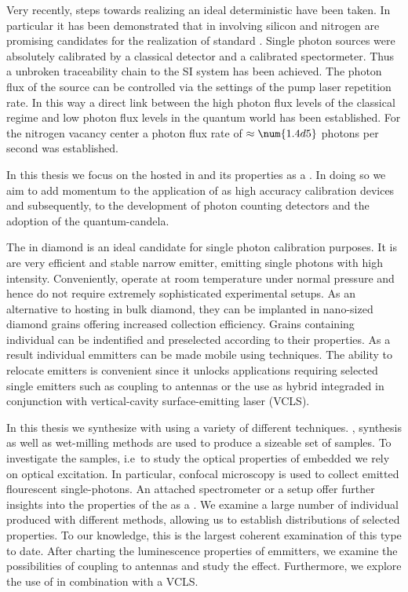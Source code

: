 	Very recently, steps towards realizing an ideal deterministic \sps have been taken. In particular it has been demonstrated that \ccs in \nds involving silicon \cite{Rodiek2017::12, Rodiek2017::13} and nitrogen \cite{Rodiek2017::8} are promising candidates for the realization of standard \spss \cite{Rodiek2017,Vaigu2017}. Single photon sources were absolutely calibrated by a classical detector and a calibrated spectormeter. Thus a unbroken traceability chain to the SI system has been achieved. The photon flux of the source can be controlled via the settings of the pump laser repetition rate. In this way a direct link between the high photon flux levels of the classical regime and low photon flux levels in the quantum world has been established. For the nitrogen vacancy center a photon flux rate of $\approx \num{1.4d5}$ photons per second was established.

	In this thesis we focus on the \sivc hosted in \nd and its properties as a \sps. In doing so we aim to add momentum to the application of \sps as high accuracy calibration devices and subsequently, to the development of photon counting detectors and the adoption of the quantum-candela.

	The \siv in diamond is an ideal candidate for single photon calibration purposes. It is are very efficient and stable narrow \lw emitter, emitting single photons with high intensity. Conveniently, \sivs operate at room temperature under normal pressure and hence do not require extremely sophisticated experimental setups. As an alternative to hosting \sivs in bulk diamond, they can be implanted in nano-sized diamond grains offering increased collection efficiency. Grains containing individual \sivs can be indentified and preselected according to their properties. As a result individual emmitters can be made mobile using \pp techniques. The ability to relocate emitters is convenient since it unlocks applications requiring selected single emitters such as coupling to antennas or the use as hybrid integraded \spss in conjunction with vertical-cavity surface-emitting laser (VCLS).

	In this thesis we synthesize \nds with \sivs using a variety of different techniques. \Cvd, \hpht synthesis as well as wet-milling methods are used to produce a sizeable set of samples. To investigate the samples, i.e\ to study the optical properties of embedded \sivs we rely on optical excitation. In particular, confocal microscopy is used to collect emitted flourescent single-photons. An attached spectrometer or a \HBT setup offer further insights into the properties of the \siv as a \sps. We examine a large number of individual \sivs produced with different methods, allowing us to establish distributions of selected \siv properties. To our knowledge, this is the largest coherent examination of this type to date. After charting the luminescence properties of emmitters, we examine the possibilities of coupling \sivs to antennas and study the effect. Furthermore, we explore the use of \sivs in combination with a VCLS.

